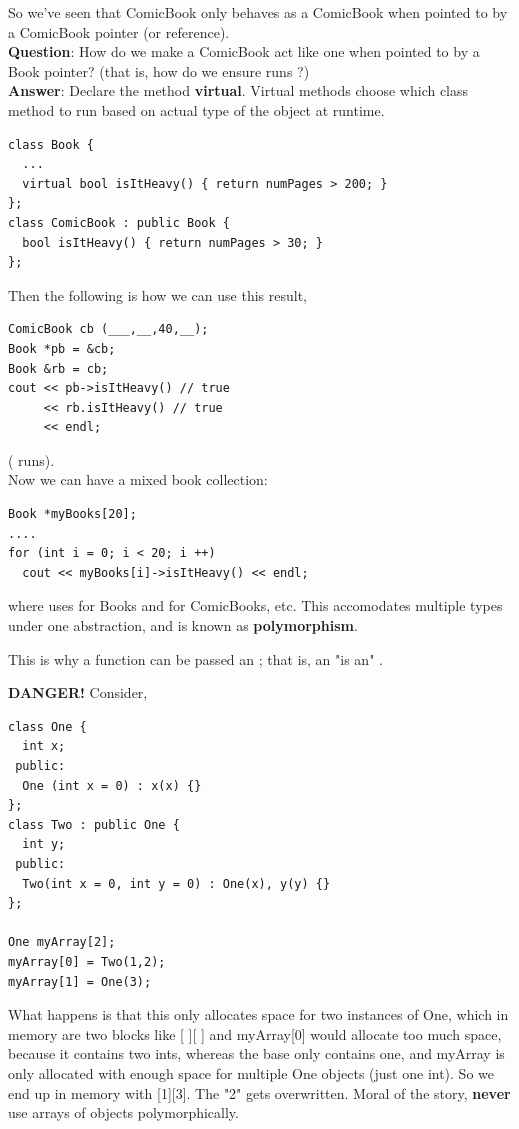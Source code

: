 \documentclass[english, 11pt]{article}
\begin{document}
So we've seen that ComicBook only behaves as a ComicBook when pointed to by a ComicBook pointer (or reference). \\
\textbf{Question}: How do we make a ComicBook act like one when pointed to by a Book pointer? (that is, how do we ensure  runs ?) \\
\textbf{Answer}: Declare the method \textbf{virtual}. Virtual methods choose which class method to run based on actual type of the object at runtime.
\begin{lstlisting}
class Book {
  ...
  virtual bool isItHeavy() { return numPages > 200; }
};
class ComicBook : public Book {
  bool isItHeavy() { return numPages > 30; }
};
\end{lstlisting}
Then the following is how we can use this result,
\begin{lstlisting}
ComicBook cb (___,__,40,__);
Book *pb = &cb;
Book &rb = cb;
cout << pb->isItHeavy() // true
     << rb.isItHeavy() // true
     << endl;
\end{lstlisting}
( runs). \\

Now we can have a mixed book collection:
\begin{lstlisting}
Book *myBooks[20];
....
for (int i = 0; i < 20; i ++)
  cout << myBooks[i]->isItHeavy() << endl;
\end{lstlisting}
where  uses  for Books and  for ComicBooks, etc. This accomodates multiple types under one abstraction, and is known as \textbf{polymorphism}.

\begin{note}
  This is why a function  can be passed an ; that is, an  "is an" .
\end{note}

\textbf{DANGER!} Consider,
\begin{lstlisting}
class One {
  int x;
 public:
  One (int x = 0) : x(x) {}
};
class Two : public One {
  int y;
 public:
  Two(int x = 0, int y = 0) : One(x), y(y) {}
};

One myArray[2];
myArray[0] = Two(1,2);
myArray[1] = One(3);
\end{lstlisting}
What happens is that this only allocates space for two instances of One, which in memory are two blocks like [ ][ ] and myArray[0] would allocate too much space, because it contains two ints, whereas the base only contains one, and myArray is only allocated with enough space for multiple One objects (just one int). So we end up in memory with [1][3]. The "2" gets overwritten. Moral of the story, \textbf{never} use arrays of objects polymorphically. \\
\end{document}

